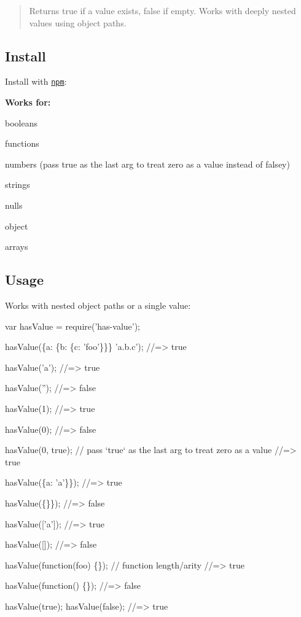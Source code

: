 \begin{quote}
Returns true if a value exists, false if empty. Works with deeply nested values using object paths. \end{quote}


\subsection*{Install}

Install with \href{https://www.npmjs.com/}{\tt npm}\+:




{\bfseries Works for\+:}


\begin{DoxyItemize}
\item booleans
\item functions
\item numbers (pass {\ttfamily true} as the last arg to treat zero as a value instead of falsey)
\item strings
\item nulls
\item object
\item arrays
\end{DoxyItemize}

\subsection*{Usage}

Works with nested object paths or a single value\+:


\begin{DoxyCode}
var hasValue = require('has-value');

hasValue(\{a: \{b: \{c: 'foo'\}\}\} 'a.b.c');
//=> true

hasValue('a');
//=> true

hasValue('');
//=> false

hasValue(1);
//=> true

hasValue(0);
//=> false

hasValue(0, true); // pass `true` as the last arg to treat zero as a value
//=> true

hasValue(\{a: 'a'\}\});
//=> true

hasValue(\{\}\});
//=> false

hasValue(['a']);
//=> true

hasValue([]);
//=> false

hasValue(function(foo) \{\}); // function length/arity
//=> true

hasValue(function() \{\});
//=> false

hasValue(true);
hasValue(false);
//=> true
\end{DoxyCode}


